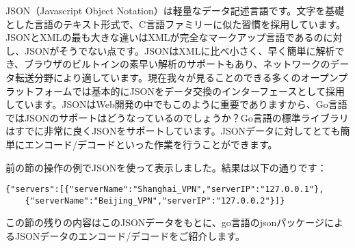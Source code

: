 JSON（Javascript Object Notation）は軽量なデータ記述言語です。文字を基礎とした言語のテキスト形式で、C言語ファミリーに似た習慣を採用しています。JSONとXMLの最も大きな違いはXMLが完全なマークアップ言語であるのに対し、JSONがそうでない点です。JSONはXMLに比べ小さく、早く簡単に解析でき、ブラウザのビルトインの素早い解析のサポートもあり、ネットワークのデータ転送分野により適しています。現在我々が見ることのできる多くのオープンプラットフォームでは基本的にJSONをデータ交換のインターフェースとして採用しています。JSONはWeb開発の中でもこのように重要でありますから、Go言語ではJSONのサポートはどうなっているのでしょうか？Go言語の標準ライブラリはすでに非常に良くJSONをサポートしています。JSONデータに対してとても簡単にエンコード/デコードといった作業を行うことができます。

前の節の操作の例でJSONを使って表示しました。結果は以下の通りです：

\begin{lstlisting}[numbers=none]
{"servers":[{"serverName":"Shanghai_VPN","serverIP":"127.0.0.1"},
    {"serverName":"Beijing_VPN","serverIP":"127.0.0.2"}]}
\end{lstlisting}

この節の残りの内容はこのJSONデータをもとに、go言語のjsonパッケージによるJSONデータのエンコード/デコードをご紹介します。
